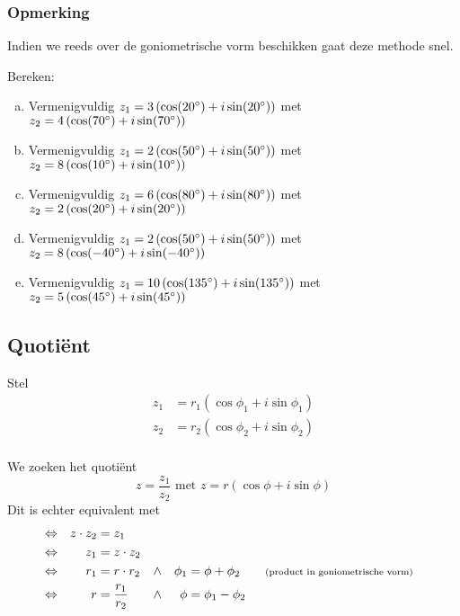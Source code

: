 \documentclass[12pt,twoside,a4paper]{article}
\begin{document}
\subsubsection*{Opmerking}

Indien we reeds over de goniometrische vorm beschikken gaat deze methode snel.

\begin{oefening}
Bereken:
\begin{enumerate}[(a)]
  \itemsep.5em
  \item Vermenigvuldig $z_1=3\left(\cos(20^\circ)+i\sin(20^\circ)\right)$ met $z_2=4\left(\cos(70^\circ)+i\sin(70^\circ)\right)$
  \item Vermenigvuldig $z_1=2\left(\cos(50^\circ)+i\sin(50^\circ)\right)$ met $z_2=8\left(\cos(10^\circ)+i\sin(10^\circ)\right)$
  \item Vermenigvuldig $z_1=6\left(\cos(80^\circ)+i\sin(80^\circ)\right)$ met $z_2=2\left(\cos(20^\circ)+i\sin(20^\circ)\right)$
  \item Vermenigvuldig $z_1=2\left(\cos(50^\circ)+i\sin(50^\circ)\right)$ met $z_2=8\left(\cos(-40^\circ)+i\sin(-40^\circ)\right)$
  \item Vermenigvuldig $z_1=10\left(\cos(135^\circ)+i\sin(135^\circ)\right)$ met $z_2=5\left(\cos(45^\circ)+i\sin(45^\circ)\right)$
\end{enumerate}
\end{oefening}

\subsection{Quotiënt}

Stel
\begin{align*}
  z_1 &= r_1 ( \cos \phi_1 + i \sin \phi_1 )\\
  z_2 &= r_2 ( \cos \phi_2 + i \sin \phi_2 )\\
\end{align*}

We zoeken het quotiënt
\[z=\dfrac{z_1}{z_2} \mbox{ met } z=r(\cos \phi + i\sin \phi)\]
Dit is echter equivalent met
\begin{align*}
  &\Leftrightarrow& z \cdot z_2 &= z_1\\
  &\Leftrightarrow& z_1 &= z \cdot z_2\\
  &\Leftrightarrow& r_1 &= r \cdot r_2          &\wedge&&  \phi_1 &= \phi + \phi_2 \qquad \mbox{\scriptsize(product in goniometrische vorm)}\\
  &\Leftrightarrow&   r &= \dfrac{r_1}{r_2} &\wedge&&  \phi &= \phi_1 - \phi_2\\
\end{align*}
\end{document}
